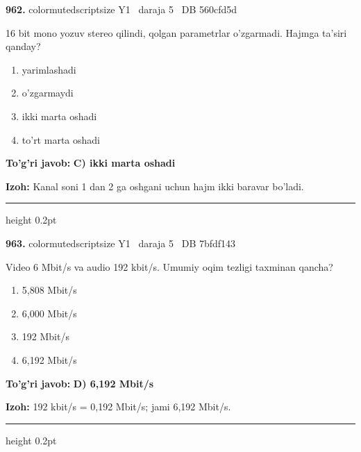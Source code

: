 \documentclass[10pt,a4paper,oneside]{article}
\begin{document}
\noindent\textbf{\color{ink}962.}  {color{muted}scriptsize Y1 \textbullet\ daraja 5 \textbullet\ DB 560cfd5d}
\par
16 bit mono yozuv stereo qilindi, qolgan parametrlar o'zgarmadi. Hajmga ta'siri qanday?
\begin{enumerate}[label=\Alph*),leftmargin=9mm]
\item yarimlashadi
\item o'zgarmaydi
\item ikki marta oshadi
\item to'rt marta oshadi
\end{enumerate}
\begin{tcolorbox}[enhanced,breakable,colback=teal!4,colframe=teal!50!black,boxrule=0.5pt,arc=1.1mm,left=3mm,right=3mm,top=1.7mm,bottom=1.7mm,before skip=2mm,after skip=2mm]
\textbf{\color{teal}To'g'ri javob:} \textbf{C) ikki marta oshadi}
\par\smallskip
\textbf{Izoh:} Kanal soni 1 dan 2 ga oshgani uchun hajm ikki baravar bo'ladi.
\end{tcolorbox}
\vspace{2mm}\hrule height 0.2pt \vspace{3mm}

\noindent\textbf{\color{ink}963.}  {color{muted}scriptsize Y1 \textbullet\ daraja 5 \textbullet\ DB 7bfdf143}
\par
Video 6 Mbit/s va audio 192 kbit/s. Umumiy oqim tezligi taxminan qancha?
\begin{enumerate}[label=\Alph*),leftmargin=9mm]
\item 5,808 Mbit/s
\item 6,000 Mbit/s
\item 192 Mbit/s
\item 6,192 Mbit/s
\end{enumerate}
\begin{tcolorbox}[enhanced,breakable,colback=teal!4,colframe=teal!50!black,boxrule=0.5pt,arc=1.1mm,left=3mm,right=3mm,top=1.7mm,bottom=1.7mm,before skip=2mm,after skip=2mm]
\textbf{\color{teal}To'g'ri javob:} \textbf{D) 6,192 Mbit/s}
\par\smallskip
\textbf{Izoh:} 192 kbit/s = 0,192 Mbit/s; jami 6,192 Mbit/s.
\end{tcolorbox}
\vspace{2mm}\hrule height 0.2pt \vspace{3mm}
\end{document}
